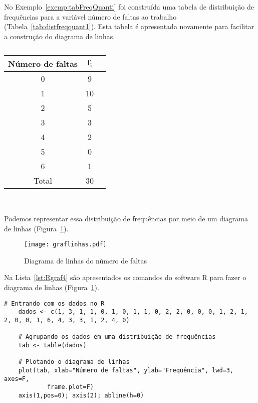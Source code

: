 \documentclass[11pt,fleqn]{book} %
\begin{document}
\begin{example}

No Exemplo~\ref{exemp:tabFreqQuanti} foi construída uma tabela de distribuição de frequências para a variável  número de faltas ao trabalho (Tabela~\ref{tab:distfreqquant1}). Esta tabela é apresentada novamente para facilitar a construção do diagrama de linhas.


\begin{table}[h]
	\begin{rBox}
	\captionsetup{labelformat=empty}
	\caption{}
	\centering
	{\color{olivine!130}\begin{tabular}{c c c}
	\toprule
	\textbf{Número de faltas} & $\bm{f_i}$ & \\
	\midrule
	0 & 9 \\
	1 & 10 \\
	2 & 5 \\
	3 & 3 \\
	4 & 2 \\
	5 & 0 \\
	6 & 1 \\
	\hline
	Total & 30 \\
	\bottomrule
	\end{tabular}} \\
	\end{rBox}
\end{table}

Podemos representar essa distribuição de frequências por meio de um diagrama de linhas (Figura~\ref{fig:graflinhas}).

\begin{figure}[h!]
\centering\texttt{[image: graflinhas.pdf]}
\setlength{\abovecaptionskip}{0.5pt}
\caption{Diagrama de linhas do número de faltas}
\label{fig:graflinhas} %
\end{figure}
	
\end{example}



\vspace{0,5cm}

Na Lista~\ref{lst:Rgraf4} são apresentados os comandos do software R para fazer o diagrama de linhas (Figura~\ref{fig:graflinhas}).  \\

\begin{scriptsize}
	\estiloR
	\begin{lstlisting}[caption={Comandos do software R}, label=lst:Rgraf4]
	# Entrando com os dados no R
	dados <- c(1, 3, 1, 1, 0, 1, 0, 1, 1, 0, 2, 2, 0, 0, 0, 1, 2, 1, 2, 0, 0, 1, 6, 4, 3, 3, 1, 2, 4, 0)
	 
	# Agrupando os dados em uma distribuição de frequências
	tab <- table(dados)
	
	# Plotando o diagrama de linhas
	plot(tab, xlab="Número de faltas", ylab="Frequência", lwd=3, axes=F, 
			frame.plot=F)
	axis(1,pos=0); axis(2); abline(h=0)
	
	\end{lstlisting}
\end{scriptsize}
\end{document}
